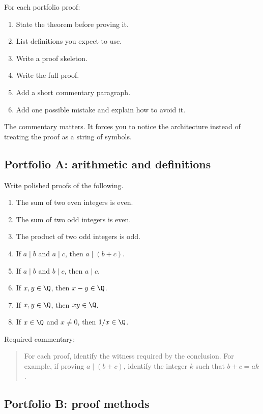 For each portfolio proof:

\begin{enumerate}
\item State the theorem before proving it.
\item List definitions you expect to use.
\item Write a proof skeleton.
\item Write the full proof.
\item Add a short commentary paragraph.
\item Add one possible mistake and explain how to avoid it.
\end{enumerate}

The commentary matters. It forces you to notice the architecture instead of treating the proof as a string of symbols.

\subsection{Portfolio A: arithmetic and definitions}

Write polished proofs of the following.

\begin{enumerate}
\item The sum of two even integers is even.
\item The sum of two odd integers is even.
\item The product of two odd integers is odd.
\item If $a\mid b$ and $a\mid c$, then $a\mid(b+c)$.
\item If $a\mid b$ and $b\mid c$, then $a\mid c$.
\item If $x,y\in\Q$, then $x-y\in\Q$.
\item If $x,y\in\Q$, then $xy\in\Q$.
\item If $x\in\Q$ and $x\neq0$, then $1/x\in\Q$.
\end{enumerate}

Required commentary:

\begin{quote}
For each proof, identify the witness required by the conclusion. For example, if proving $a\mid(b+c)$, identify the integer $k$ such that $b+c=ak$.
\end{quote}

\subsection{Portfolio B: proof methods}

